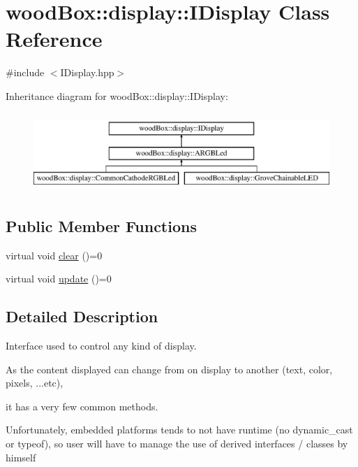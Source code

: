 \hypertarget{classwood_box_1_1display_1_1_i_display}{}\section{wood\+Box\+:\+:display\+:\+:I\+Display Class Reference}
\label{classwood_box_1_1display_1_1_i_display}


{\ttfamily \#include $<$I\+Display.\+hpp$>$}

Inheritance diagram for wood\+Box\+:\+:display\+:\+:I\+Display\+:\begin{figure}[H]
\begin{center}
\leavevmode
\includegraphics[height=3.000000cm]{classwood_box_1_1display_1_1_i_display}
\end{center}
\end{figure}
\subsection*{Public Member Functions}
\begin{DoxyCompactItemize}
\item 
virtual void \mbox{\hyperlink{classwood_box_1_1display_1_1_i_display_a7030f0768c1ef15ce936a259406168dc}{clear}} ()=0
\item 
virtual void \mbox{\hyperlink{classwood_box_1_1display_1_1_i_display_ad8c0811b8b807ce119a06c7806004de7}{update}} ()=0
\end{DoxyCompactItemize}


\subsection{Detailed Description}
Interface used to control any kind of display.

As the content displayed can change from on display to another (text, color, pixels, ...etc),

it has a very few common methods.

Unfortunately, embedded platforms tends to not have runtime (no {\ttfamily dynamic\+\_\+cast} or {\ttfamily typeof}), so user will have to manage the use of derived interfaces / classes by himself 

